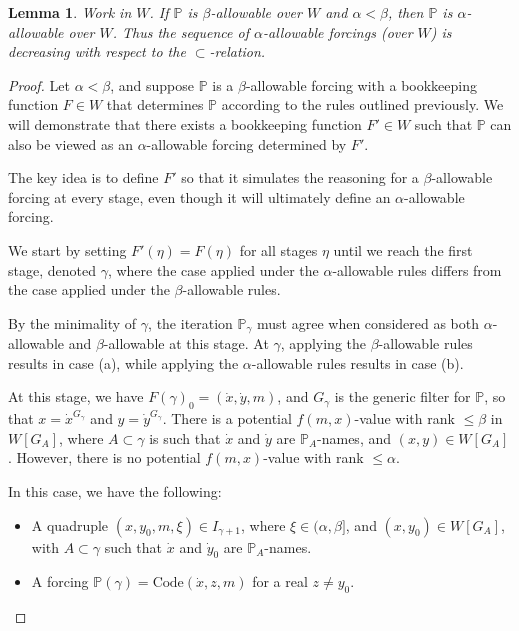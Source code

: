 \documentclass[a4paper,11pt]{article}
\newtheorem{lemma}[theorem]{Lemma}
\newcommand{\forceP}{\mathbb{P}}
\begin{document}
\par \medskip


\begin{lemma}\label{shrinkinglemma}
Work in $W$. If $\forceP$ is $\beta$-allowable over $W$ and $\alpha < \beta$, then $\forceP$ is $\alpha$-allowable over $W$. Thus the sequence of $\alpha$-allowable forcings (over $W$) is decreasing with respect to the $\subset$-relation.
\end{lemma}
\begin{proof}
Let \( \alpha < \beta \), and suppose \( \forceP \) is a \( \beta \)-allowable forcing with a bookkeeping function \( F \in W \) that determines \( \forceP \) according to the rules outlined previously. We will demonstrate that there exists a bookkeeping function \( F' \in W \) such that \( \forceP \) can also be viewed as an \( \alpha \)-allowable forcing determined by \( F' \).

The key idea is to define \( F' \) so that it simulates the reasoning for a \( \beta \)-allowable forcing at every stage, even though it will ultimately define an \( \alpha \)-allowable forcing.



We start by setting \( F'(\eta) = F(\eta) \) for all stages \( \eta \) until we reach the first stage, denoted \( \gamma \), where the case applied under the \( \alpha \)-allowable rules differs from the case applied under the \( \beta \)-allowable rules. 

By the minimality of \( \gamma \), the iteration \( \forceP_{\gamma} \) must agree when considered as both \( \alpha \)-allowable and \( \beta \)-allowable at this stage. At \( \gamma \), applying the \( \beta \)-allowable rules results in case (a), while applying the \( \alpha \)-allowable rules results in case (b).

At this stage, we have \( F(\gamma)_0 = (\dot{x}, \dot{y}, m) \), and \( G_{\gamma} \) is the generic filter for \( \forceP \), so that \( x = \dot{x}^{G_{\gamma}} \) and \( y = \dot{y}^{G_{\gamma}} \). There is a potential \( f(m,x) \)-value with rank \( \le \beta \) in \( W[G_A] \), where \( A \subset \gamma \) is such that \( \dot{x} \) and \( \dot{y} \) are \( \forceP_A \)-names, and \( (x, y) \in W[G_A] \). However, there is no potential \( f(m,x) \)-value with rank \( \le \alpha \).

In this case, we have the following:
\begin{itemize}
\item[-] A quadruple \( (x, y_0, m, \xi) \in I_{\gamma+1} \), where \( \xi \in (\alpha, \beta] \), and \( (x, y_0) \in W[G_A] \), with \( A \subset \gamma \) such that \( \dot{x} \) and \( \dot{y}_0 \) are \( \forceP_A \)-names.
\item[-]  A forcing \( \forceP(\gamma) = \text{Code}(\dot{x}, z, m) \) for a real \( z \neq y_0 \).
\end{itemize}



\end{proof}
\end{document}
